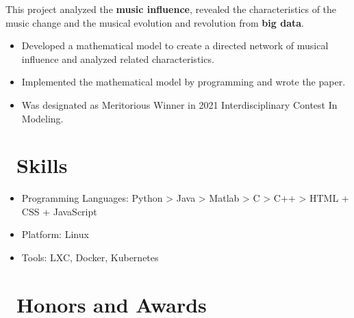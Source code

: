 \documentclass{resume}
\begin{document}
This project analyzed the \textbf{music influence}, revealed the characteristics of the music change and the musical evolution and revolution from \textbf{big data}. 
\begin{itemize}
  \item Developed a mathematical model to create a directed network of musical influence and analyzed related characteristics.
  \item Implemented the mathematical model by programming and wrote the paper.
  \item Was designated as Meritorious Winner in 2021 Interdisciplinary Contest In Modeling.
\end{itemize}


\section{\faCogs\ Skills}
\begin{itemize}[parsep=0.5ex]
  \item Programming Languages: Python > Java > Matlab > C > C++ > HTML + CSS + JavaScript
  \item Platform: Linux
  \item Tools: LXC, Docker, Kubernetes
\end{itemize}

\section{\faHeartO\ Honors and Awards}
\end{document}
